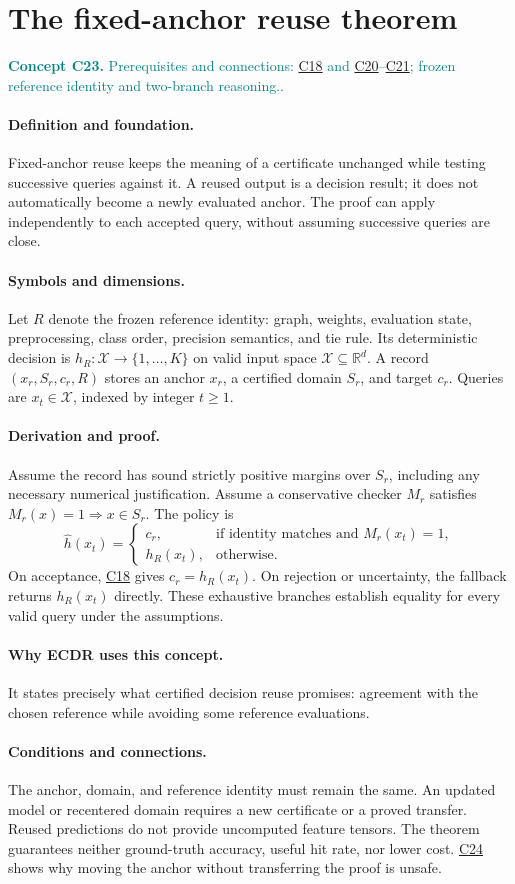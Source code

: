 \documentclass[11pt,a4paper]{article}
\newcommand{\R}{\mathbb R}
\newcommand{\conceptid}{Front matter}
\newcommand{\concept}[3]{\clearpage\renewcommand{\conceptid}{#1}%
\section{#2}\label{concept:#1}%
\textcolor{teal}{\textbf{Concept #1.} Prerequisites and connections: #3.}\par
\typeout{ECDR-CONCEPT-START #1 PAGE=\thepage}}
\begin{document}
\concept{C23}{The fixed-anchor reuse theorem}{\hyperref[concept:C18]{C18} and \hyperref[concept:C20]{C20}--\hyperref[concept:C21]{C21}; frozen reference identity and two-branch reasoning.}
\paragraph{Definition and foundation.}
Fixed-anchor reuse keeps the meaning of a certificate unchanged while testing successive queries against it. A reused output is a decision result; it does not automatically become a newly evaluated anchor. The proof can apply independently to each accepted query, without assuming successive queries are close.
\paragraph{Symbols and dimensions.}
Let $R$ denote the frozen reference identity: graph, weights, evaluation state, preprocessing, class order, precision semantics, and tie rule. Its deterministic decision is $h_R:\mathcal X\to\{1,\ldots,K\}$ on valid input space $\mathcal X\subseteq\R^d$. A record $(x_r,S_r,c_r,R)$ stores an anchor $x_r$, a certified domain $S_r$, and target $c_r$. Queries are $x_t\in\mathcal X$, indexed by integer $t\ge1$.
\paragraph{Derivation and proof.}
Assume the record has sound strictly positive margins over $S_r$, including any necessary numerical justification. Assume a conservative checker $M_r$ satisfies $M_r(x)=1\Rightarrow x\in S_r$. The policy is
\[
 \widehat h(x_t)=
 \begin{cases}c_r,&\text{if identity matches and }M_r(x_t)=1,\\
 h_R(x_t),&\text{otherwise.}\end{cases}
\]
On acceptance, \hyperref[concept:C18]{C18} gives $c_r=h_R(x_t)$. On rejection or uncertainty, the fallback returns $h_R(x_t)$ directly. These exhaustive branches establish equality for every valid query under the assumptions.
\paragraph{Why ECDR uses this concept.}
It states precisely what certified decision reuse promises: agreement with the chosen reference while avoiding some reference evaluations.
\paragraph{Conditions and connections.}
The anchor, domain, and reference identity must remain the same. An updated model or recentered domain requires a new certificate or a proved transfer. Reused predictions do not provide uncomputed feature tensors. The theorem guarantees neither ground-truth accuracy, useful hit rate, nor lower cost. \hyperref[concept:C24]{C24} shows why moving the anchor without transferring the proof is unsafe.
\par\label{endconcept:C23}
\end{document}
